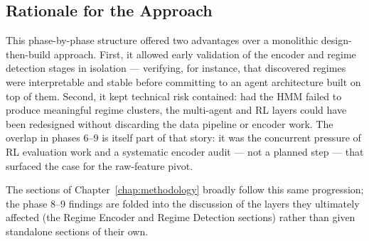\subsection{Rationale for the Approach}
\label{subsec:methodology-rationale}

This phase-by-phase structure offered two advantages over a monolithic design-then-build approach. First, it allowed early validation of the encoder and regime detection stages in isolation --- verifying, for instance, that discovered regimes were interpretable and stable before committing to an agent architecture built on top of them. Second, it kept technical risk contained: had the HMM failed to produce meaningful regime clusters, the multi-agent and RL layers could have been redesigned without discarding the data pipeline or encoder work. The overlap in phases 6--9 is itself part of that story: it was the concurrent pressure of RL evaluation work and a systematic encoder audit --- not a planned step --- that surfaced the case for the raw-feature pivot.

The sections of Chapter~\ref{chap:methodology} broadly follow this same progression; the phase 8--9 findings are folded into the discussion of the layers they ultimately affected (the Regime Encoder and Regime Detection sections) rather than given standalone sections of their own.